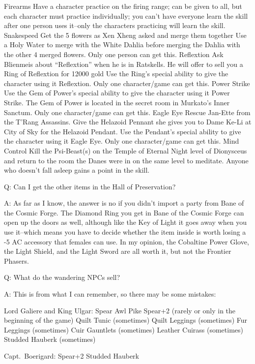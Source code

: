 \documentclass[12pt]{article}
\begin{document}
Firearms Have a character practice on the firing range; can be given to
all, but each character must practice individually; you can't have
everyone learn the skill after one person uses it--only the characters
practicing will learn the skill. Snakespeed Get the 5 flowers as Xen
Xheng asked and merge them together Use a Holy Water to merge with the
White Dahlia before merging the Dahlia with the other 4 merged flowers.
Only one person can get this. Reflextion Ask Blienmeis about
``Reflextion'' when he is in Ratskells. He will offer to sell you a Ring
of Reflextion for 12000 gold Use the Ring's special ability to give the
character using it Reflextion. Only one character/game can get this.
Power Strike Use the Gem of Power's special ability to give the
character using it Power Strike. The Gem of Power is located in the
secret room in Murkato's Inner Sanctum. Only one character/game can get
this. Eagle Eye Rescue Jan-Ette from the T'Rang Assassins. Give the
Helazoid Pennant she gives you to Dame Ke-Li at City of Sky for the
Helazoid Pendant. Use the Pendant's special ability to give the
character using it Eagle Eye. Only one character/game can get this. Mind
Control Kill the Psi-Beast(s) on the Temple of Eternal Night level of
Dionysceus and return to the room the Danes were in on the same level to
meditate. Anyone who doesn't fall asleep gains a point in the skill.

Q: Can I get the other items in the Hall of Preservation?

A: As far as I know, the answer is no if you didn't import a party from
Bane of the Cosmic Forge. The Diamond Ring you get in Bane of the Cosmic
Forge can open up the doors as well, although like the Key of Light it
goes away when you use it--which means you have to decide whether the
item inside is worth losing a -5 AC accessory that females can use. In
my opinion, the Cobaltine Power Glove, the Light Shield, and the Light
Sword are all worth it, but not the Frontier Phasers.

Q: What do the wandering NPCs sell?

A: This is from what I can remember, so there may be some mistakes:

Lord Galiere and King Ulgar: Spear Awl Pike Spear+2 (rarely or only in
the beginning of the game) Quilt Tunic (sometimes) Quilt Leggings
(sometimes) Fur Leggings (sometimes) Cuir Gauntlets (sometimes) Leather
Cuirass (sometimes) Studded Hauberk (sometimes)

Capt.~Boerigard: Spear+2 Studded Hauberk
\end{document}
